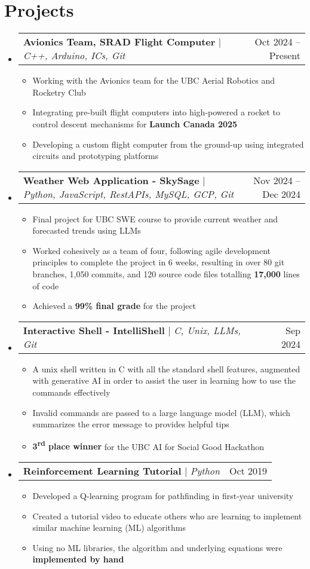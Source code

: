 \documentclass[letterpaper,11.5pt]{article}
\makeatletter
\newcommand{\resumeItem}[1]{
  \item\small{
    {#1 \vspace{-2pt}}
  }
}
\newcommand{\resumeProjectHeading}[2]{
    \item
    \begin{tabular*}{0.97\textwidth}{l@{\extracolsep{\fill}}r}
      \small#1 & #2 \\
    \end{tabular*}\vspace{-7pt}
}
\newcommand{\resumeSubHeadingListStart}{\begin{itemize}[leftmargin=0.15in, label={}]}
\newcommand{\resumeSubHeadingListEnd}{\end{itemize}}
\newcommand{\resumeItemListStart}{\begin{itemize}}
\newcommand{\resumeItemListEnd}{\end{itemize}\vspace{-5pt}}
\def\projectSpaceBefore{1pt}
\makeatother
\begin{document}
\section{Projects}
    \resumeSubHeadingListStart
      \resumeProjectHeading
          {\textbf{Avionics Team, SRAD Flight Computer} $|$ \emph{C++, Arduino, ICs, Git}}{Oct 2024 -- Present}
          \resumeItemListStart
            \vspace{\projectSpaceBefore}
            \resumeItem{Working with the Avionics team for the UBC Aerial Robotics and Rocketry Club}
            \resumeItem{Integrating pre-built flight computers into high-powered a rocket to control descent mechanisms for \textbf{Launch Canada 2025}}
            \resumeItem{Developing a custom flight computer from the ground-up using integrated circuits and prototyping platforms}
          \resumeItemListEnd
      \resumeProjectHeading
          {\textbf{Weather Web Application - SkySage} $|$ \emph{Python, JavaScript, RestAPIs, MySQL, GCP, Git}}{Nov 2024 -- Dec 2024}
          \resumeItemListStart
            \vspace{\projectSpaceBefore}
            \resumeItem{Final project for UBC SWE course to provide current weather and forecasted trends using LLMs}
            \resumeItem{Worked cohesively as a team of four, following agile development principles to complete the project in 6 weeks, resulting in over 80 git branches, 1,050 commits, and 120 source code files totalling \textbf{17,000} lines of code}
            \resumeItem{Achieved a \textbf{99\% final grade} for the project}
          \resumeItemListEnd
      \resumeProjectHeading
          {\textbf{Interactive Shell - IntelliShell} $|$ \emph{C, Unix, LLMs, Git}}{Sep 2024}
          \resumeItemListStart
            \vspace{\projectSpaceBefore}
            \resumeItem{A unix shell written in C with all the standard shell features, augmented with generative AI in order to assist the user in learning how to use the commands effectively}
            \resumeItem{Invalid commands are passed to a large language model (LLM), which summarizes the error message to provides helpful tips}
            \resumeItem{\textbf{3\textsuperscript{rd} place winner} for the UBC AI for Social Good Hackathon}
          \resumeItemListEnd
      \resumeProjectHeading
          {\textbf{Reinforcement Learning Tutorial} $|$ \emph{Python}}{Oct 2019}
          \resumeItemListStart
            \vspace{\projectSpaceBefore}
            \resumeItem{Developed a Q-learning program for pathfinding in first-year university}
            \resumeItem{Created a tutorial video to educate others who are learning to implement similar machine learning (ML) algorithms}
            \resumeItem{Using no ML libraries, the algorithm and underlying equations were \textbf{implemented by hand}}
          \resumeItemListEnd
    \resumeSubHeadingListEnd
\end{document}
